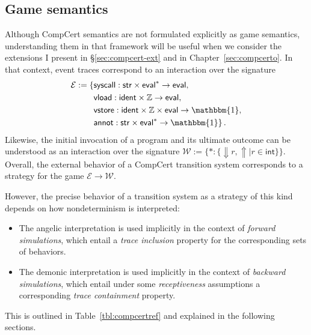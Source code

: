 \documentclass[11pt,oneside,draft]{book}
\theoremstyle{definition}
\newcommand{\kw}[1]{\ensuremath{ \mathsf{#1} }}
\begin{document}

\subsection{Game semantics} %

Although CompCert semantics
are not formulated explicitly as game semantics,
understanding them in that framework
will be useful
when we consider the extensions I present in \S\ref{sec:compcert-ext}
and in Chapter~\ref{sec:compcerto}.
In that context,
event traces correspond to an interaction
over the signature
\begin{align*}
  \mathcal{E} := \{ {}
    &\kw{syscall} :
      \kw{str} \times \kw{eval}^* \rightarrow \kw{eval},
      \\
    &\kw{vload} :
      \kw{ident} \times \mathbb{Z} \rightarrow \kw{eval},
      \\
    &\kw{vstore} :
      \kw{ident} \times \mathbb{Z} \times \kw{eval} \rightarrow \mathbbm{1},
      \\
    &\kw{annot} :
      \kw{str} \times \kw{eval}^* \rightarrow \mathbbm{1}
  \}
  \,.
\end{align*}
Likewise,
the initial invocation of a program
and its ultimate outcome can
be understood as an interaction over the signature
$
  \mathcal{W} := \{
    {*} : \{ {\Downarrow} r, {\Uparrow} \mid r \in \kw{int} \}
  \}
$.
Overall,
the external behavior of
a CompCert transition system
corresponds to a strategy
for the game $\mathcal{E} \rightarrow \mathcal{W}$.

However,
the precise behavior of a transition system
as a strategy of this kind
depends on how nondeterminism is interpreted:
\begin{itemize}
  \item
    The angelic interpretation
    is used implicitly in the context of
    \emph{forward simulations},
    which entail a \emph{trace inclusion} property
    for the corresponding sets of behaviors.
  \item
    The demonic interpretation
    is used implicitly in the context of
    \emph{backward simulations},
    which entail
    under some \emph{receptiveness} assumptions
    a corresponding \emph{trace containment} property.
\end{itemize}
This is outlined in Table~\ref{tbl:compcertref}
and explained in the following sections.
\end{document}
